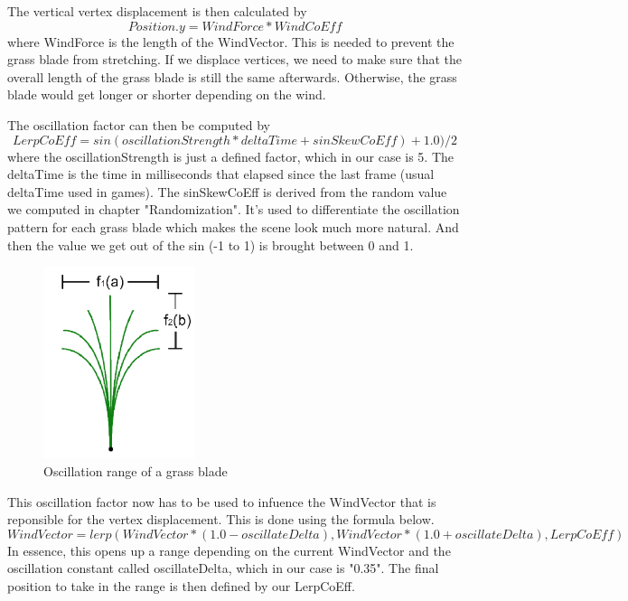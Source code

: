\documentclass[conference]{acmsiggraph}
\begin{document}
The vertical vertex displacement is then calculated by
\begin{equation}
Position.y = WindForce * WindCoEff
\end{equation}
where WindForce is the length of the WindVector. This is needed to prevent the grass blade from stretching. If we displace vertices, we need to make sure that the overall length of the grass blade is still the same afterwards. Otherwise, the grass blade would get longer or shorter depending on the wind.

The oscillation factor can then be computed by
\begin{equation}
LerpCoEff = sin(oscillationStrength * deltaTime + sinSkewCoEff) + 1.0) / 2
\end{equation}
where the oscillationStrength is just a defined factor, which in our case is 5. The deltaTime is the time in milliseconds that elapsed since the last frame (usual deltaTime used in games). The sinSkewCoEff is derived from the random value we computed in chapter "Randomization". It's used to differentiate the oscillation pattern for each grass blade which makes the scene look much more natural. And then the value we get out of the sin (-1 to 1) is brought between 0 and 1.

 \begin{figure}[ht]
   \centering
   \includegraphics[width=1.75in]{images/oscillation}
   \caption{Oscillation range of a grass blade}
 \end{figure}

This oscillation factor now has to be used to infuence the WindVector that is reponsible for the vertex displacement. This is done using the formula below.
\begin{equation}
WindVector = lerp(WindVector * (1.0 - oscillateDelta), WindVector * (1.0 + oscillateDelta), LerpCoEff)
\end{equation}
In essence, this opens up a range depending on the current WindVector and the oscillation constant called oscillateDelta, which in our case is "0.35". The final position to take in the range is then defined by our LerpCoEff.
\end{document}
